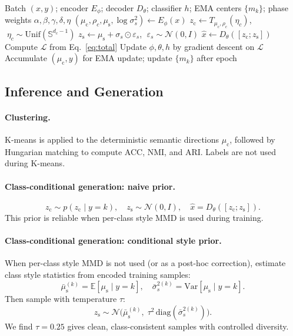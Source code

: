 \documentclass[10pt]{article}
\newcommand{\ours}{F-CS-WAE}
\newcommand{\zc}{z_{\mathrm{c}}}
\newcommand{\zs}{z_{\mathrm{s}}}
\newcommand{\muc}{\mu_{\mathrm{c}}}
\newcommand{\mus}{\mu_{\mathrm{s}}}
\newcommand{\Sph}{\mathbb{S}}
\newcommand{\diag}{\mathrm{diag}}
\begin{document}
\begin{algorithm}[t]
\caption{\ours{} training iteration}
\label{alg:fcswae}
\begin{algorithmic}[1]
\Require Batch $(x,y)$; encoder $E_\phi$; decoder $D_\theta$; classifier $h$;
         EMA centers $\{m_k\}$; phase weights $\alpha,\beta,\gamma,\delta,\eta$
\State $(\muc,\rho_c,\mus,\log\sigma_s^2)\leftarrow E_\phi(x)$
\State $\zc\leftarrow T_{\muc,\rho_c}(\eta_c)$, $\;\eta_c\sim\mathrm{Unif}(\Sph^{d_c-1})$
\State $\zs\leftarrow \mus+\sigma_s\odot\varepsilon_s$, $\;\varepsilon_s\sim\mathcal{N}(0,I)$
\State $\hat{x}\leftarrow D_\theta([\zc;\zs])$
\State Compute $\mathcal{L}$ from Eq.~\ref{eq:total}
\State Update $\phi,\theta,h$ by gradient descent on $\mathcal{L}$
\State Accumulate $(\muc,y)$ for EMA update; update $\{m_k\}$ after epoch
\end{algorithmic}
\end{algorithm}

\subsection{Inference and Generation}

\paragraph{Clustering.}
K-means is applied to the deterministic semantic directions $\muc$, followed by
Hungarian matching to compute ACC, NMI, and ARI.
Labels are not used during K-means.

\paragraph{Class-conditional generation: naive prior.}
\begin{equation}
  \zc\sim p(\zc\mid y{=}k), \quad
  \zs\sim\mathcal{N}(0,I), \quad
  \hat{x}=D_\theta([\zc;\zs]).
  \label{eq:naive-gen}
\end{equation}
This prior is reliable when per-class style MMD is used during training.

\paragraph{Class-conditional generation: conditional style prior.}
When per-class style MMD is not used (or as a post-hoc correction), estimate
class style statistics from encoded training samples:
\begin{equation}
  \bar\mus^{(k)} = \mathbb{E}[\mus\mid y{=}k],
  \quad
  \bar\sigma_s^{2(k)} = \mathrm{Var}[\mus\mid y{=}k].
  \label{eq:class-style-stats}
\end{equation}
Then sample with temperature $\tau$:
\begin{equation}
  \zs\sim\mathcal{N}\!\bigl(
    \bar\mus^{(k)},\;
    \tau^2\,\diag(\bar\sigma_s^{2(k)})
  \bigr).
  \label{eq:cond-style-prior}
\end{equation}
We find $\tau=0.25$ gives clean, class-consistent samples with controlled diversity.
\end{document}
